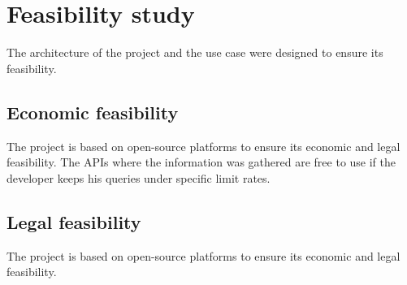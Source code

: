 \section{Feasibility study}
\nonzeroparskip The architecture of the project and the use case were designed to ensure its feasibility.

\subsection{Economic feasibility}
\nonzeroparskip The project is based on open-source platforms to ensure its economic and legal feasibility. The APIs where the information was gathered are free to use if the developer keeps his queries under specific limit rates.

\subsection{Legal feasibility}
\nonzeroparskip The project is based on open-source platforms to ensure its economic and legal feasibility. 

